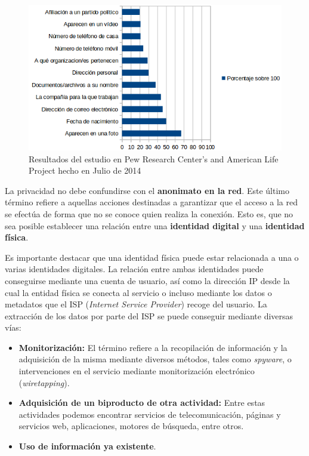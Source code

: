 \begin{figure}[H]
	\centerline{
		\mbox{\includegraphics[width=5.00in]{images/chart_privacy.png}}
	}
	\caption{Resultados del estudio en Pew Research Center's and American Life Project hecho en Julio de 2014~\cite{article:pew} }
	\label{fig:estudioPew}
\end{figure}

La privacidad no debe confundirse con el \textbf{anonimato en la
  red}. Este último término refiere a aquellas acciones destinadas a
garantizar que el acceso a la red se efectúa de forma que no se conoce
quien realiza la conexión. Esto es, que no sea posible establecer una
relación entre una \textbf{identidad digital} y una \textbf{identidad
  física}.

Es importante destacar que una identidad física puede estar
relacionada a una o varias identidades digitales. La relación entre
ambas identidades puede conseguirse mediante una cuenta de usuario,
así como la dirección IP desde la cual la entidad física se conecta al
servicio o incluso mediante los datos o metadatos que el ISP
(\textit{Internet Service Provider}) recoge del usuario. La extracción
de los datos por parte del ISP se puede conseguir mediante diversas
vías:

\begin{itemize}
	\item {\textbf{Monitorización:} El término refiere a la recopilación de información y la adquisición de la misma mediante diversos métodos, tales como \textit{spyware}, o intervenciones en el servicio mediante monitorización electrónico (\textit{wiretapping}).}
	\item {\textbf{Adquisición de un biproducto de otra actividad:} Entre estas actividades podemos encontrar servicios de telecomunicación, páginas y servicios web, aplicaciones, motores de búsqueda, entre otros.} 
	\item {\textbf{Uso de información ya existente}.}
\end{itemize} 

